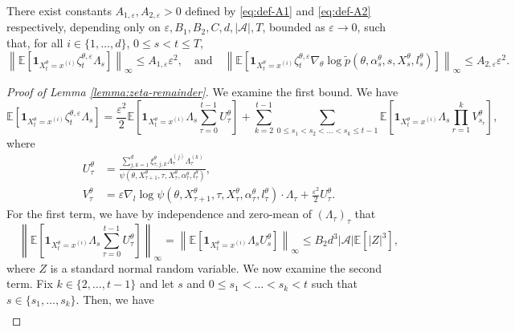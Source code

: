\documentclass[10pt,a4paper]{amsart}
\def\cA{\mathcal{A}}
\def\eps{\varepsilon}
\begin{document}
\begin{lemma}
\label{lemma:zeta-remainder}
     There exist constants $A_{1,\eps},A_{2,\eps} > 0$ defined by \eqref{eq:def-A1} and \eqref{eq:def-A2} respectively, depending only on $ \eps,B_1,B_2, C, d, | \cA |, T$, bounded as $\eps \to 0$, such that, for all $i \in \{1, \ldots, d\}$, $0 \leq s < t \leq T$, 
\[
\left\| \mathbb E \left[ \mathbf 1_{X_t^\theta = x^{(i)}} \zeta_t^{\theta, \eps} \Lambda_s  \right] \right\|_{\infty} \leq A_{1,\eps} \eps^2, \quad \text{and} \quad \left\| \mathbb E \left[ \mathbf 1_{X_t^\theta = x^{(i)}} \zeta_t^{\theta, \eps} \nabla_\theta \log \tilde p (\theta, \alpha_s^{\theta}, s,X_s^\theta, l_s^\theta) \right] \right\|_{\infty} \leq A_{2,\eps} \eps^2.
\]
\end{lemma}

\begin{proof}[Proof of Lemma \ref{lemma:zeta-remainder}]
    We examine the first bound. We have
    \[
        \mathbb E \left[ \mathbf 1_{X_t^\theta = x^{(i)}} \zeta_t^{\theta, \eps} \Lambda_s \right]
        = \frac{\eps^2}{2} \mathbb E \left[\mathbf 1_{X_t^\theta = x^{(i)}} \Lambda_s  \sum_{\tau=0}^{t-1} U_\tau^\theta \right]
        + \sum_{k = 2}^{t-1} \sum_{0 \leq s_1 < s_2 < \ldots < s_k \leq t-1} \mathbb E \left[\mathbf 1_{X_t^\theta = x^{(i)}} \Lambda_s\prod_{r = 1}^k V^\theta_{s_r}\right],
    \]
    where 
    \[ 
    \begin{aligned}
    U^\theta_\tau &= \frac{\sum_{j,k=1}^d \xi^\theta_{\tau,j,k} \Lambda_\tau^{(j)} \Lambda_\tau^{(k)}}{\psi(\theta, X_{\tau + 1}^\theta, \tau, X_\tau^\theta, \alpha_\tau^\theta, l_\tau^\theta)}, \\
    V^\theta_{\tau} &=  \eps \nabla_l \log \psi(\theta, X^\theta_{\tau + 1}, \tau,X_{\tau}^\theta, \alpha_{\tau}^\theta, l_{\tau}^\theta) \cdot \Lambda_{\tau} 
 + \frac{\eps^2}{2}U^\theta_{\tau}.
    \end{aligned}
    \]
    For the first term, we have by independence and zero-mean of $(\Lambda_\tau)_\tau$ that 
    \[
    \left\|\mathbb E \left[\mathbf 1_{X_t^\theta = x^{(i)}} \Lambda_s \sum_{\tau = 0}^{t-1}U_\tau^\theta \right] \right\|_\infty 
    = \left\| \mathbb E \left[\mathbf 1_{X_t^\theta = x^{(i)}} \Lambda_s U_s^\theta \right] \right\|_\infty 
    \leq B_2 d^3 | \cA | \mathbb E[|Z|^3],
\]
    where $Z$ is a standard normal random variable.
    We now examine the second term.
    Fix $k \in \{2, \ldots,t-1\}$ and let $s$ and $0 \leq s_1 < \ldots < s_k < t$ such that $s \in \{s_1, \ldots, s_k\}$. Then, we have
    \[
    \begin{aligned}

\end{aligned}\]
\end{proof}
\end{document}
